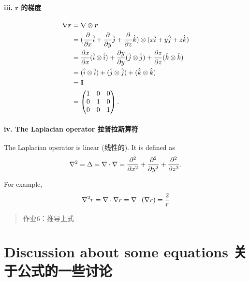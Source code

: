 \paragraph{iii. \(\boldsymbol r\) 的梯度}\label{boldsymbol-r-ux7684ux68afux5ea6}

\begin{align*}
    \nabla \boldsymbol r & = \nabla \otimes \boldsymbol r \\
    & = ({\partial \over \partial x}\hat i + {\partial \over \partial y}\hat j + {\partial \over \partial z}\hat k) \otimes (x \hat i + y \hat j + z \hat k) \\
    & = {\partial x \over \partial x} (\hat i \otimes \hat i) + {\partial y \over \partial y}(\hat j \otimes \hat j) + {\partial z \over \partial z}(\hat k \otimes \hat k)\\
    & = (\hat i \otimes \hat i) + (\hat j \otimes \hat j) + (\hat k \otimes \hat k) \\
    & =\mathbf I \\
    & = \begin{pmatrix}
        1 & 0 & 0 \\
        0 & 1 & 0 \\
        0 & 0 & 1 \\
    \end{pmatrix}.
\end{align*}

\paragraph{iv. The Laplacian operator 拉普拉斯算符}\label{the-laplacian-operator-ux62c9ux666eux62c9ux65afux7b97ux7b26}

\par

The Laplacian operator is linear (线性的). It is defined as \[\nabla^2 = \Delta = \nabla \cdot \nabla = {\partial^2 \over \partial x^2} + {\partial^2 \over \partial y^2} + {\partial^2 \over \partial z^2}.\]

For example, \[\nabla^2 r = \nabla \cdot \nabla r = \nabla \cdot (\nabla r) = {2 \over r}\]

\begin{quote}
作业6：推导上式
\end{quote}

\section{Discussion about some equations 关于公式的一些讨论}\label{discussion-about-some-equations-ux5173ux4e8eux516cux5f0fux7684ux4e00ux4e9bux8ba8ux8bba}

